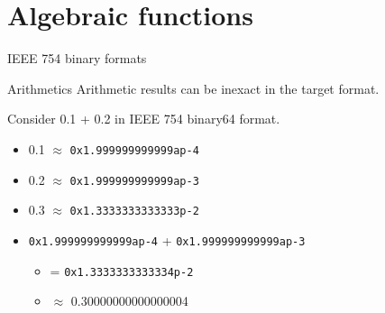 \documentclass{beamer}
\begin{document}

\section{Algebraic functions}
\begin{frame}{IEEE 754 binary formats}
\end{frame}

\begin{frame}{Arithmetics}
	Arithmetic results can be inexact in the target format.

	\begin{example}
		Consider 0.1 + 0.2 in IEEE 754 binary64 format.

		\begin{itemize}
			\item 0.1 $\approx$ \texttt{0x1.999999999999ap-4}
			\item 0.2 $\approx$ \texttt{0x1.999999999999ap-3}
			\item 0.3 $\approx$ \texttt{0x1.3333333333333p-2}
			\item \texttt{0x1.999999999999ap-4} + \texttt{0x1.999999999999ap-3}
			      \begin{itemize}
				      \item[] = \texttt{0x1.3333333333334p-2}
				      \item[] $\approx$ 0.30000000000000004
			      \end{itemize}
		\end{itemize}
	\end{example}
\end{frame}
\end{document}
